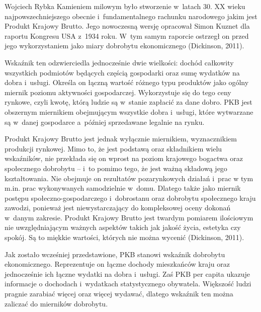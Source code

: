 \begin{artplenv}{Wojciech Rybka}
Kamieniem milowym było stworzenie w~latach 30. XX wieku najpowszechniejszego obecnie i~fundamentalnego rachunku
narodowego jakim jest Produkt Krajowy Brutto. Jego nowoczesną wersję opracował Simon Kuznet dla raportu Kongresu
USA z~1934 roku. W~tym samym raporcie ostrzegł on przed jego wykorzystaniem jako miary dobrobytu ekonomicznego
\label{ref:RND7xFAqFbE0Z}(Dickinson, 2011).

Wskaźnik ten odzwierciedla jednocześnie dwie wielkości: dochód całkowity wszystkich podmiotów będących częścią
gospodarki oraz sumę wydatków na dobra i~usługi. Określa on łączną wartość różnego typu produktów jako ogólny miernik
poziomu aktywności gospodarczej. Wykorzystuje się do tego ceny rynkowe, czyli kwotę, którą ludzie są w~stanie zapłacić
za dane dobro. PKB jest obszernym miernikiem obejmującym wszystkie dobra i~usługi, które wytwarzane są w~danej
gospodarce a~później sprzedawane legalnie na rynku.

Produkt Krajowy Brutto jest jednak wyłącznie miernikiem, wyznacznikiem produkcji rynkowej. Mimo to, że jest podstawą
oraz składnikiem wielu wskaźników, nie przekłada się on wprost na poziom krajowego bogactwa oraz społecznego
dobrobytu -- i~to pomimo tego, że jest ważną składową jego kształtowania. Nie obejmuje on rezultatów pozarynkowych działań i~prac
w tym m.in. prac wykonywanych samodzielnie w~domu. Dlatego także jako miernik postępu
społeczno-gospodarczego i~dobrostanu oraz dobrobytu społecznego kraju zawodzi, ponieważ
jest niewystarczający do kompleksowej oceny dokonań w~danym zakresie.
Produkt Krajowy Brutto jest twardym pomiarem ilościowym nie uwzględniającym ważnych aspektów takich jak
jakość życia, estetyka czy spokój. Są to miękkie wartości, których nie można wycenić
\label{ref:RNDfhz8Pbmn8G}(Dickinson, 2011).

Jak zostało wcześniej przedstawione, PKB stanowi wskaźnik dobrobytu ekonomicznego. Reprezentuje on łączne dochody
mieszkańców kraju oraz jednocześnie ich łączne wydatki na dobra i~usługi. Zaś PKB per capita ukazuje informacje o
dochodach i~wydatkach statystycznego obywatela. Większość ludzi pragnie zarabiać więcej oraz więcej wydawać, dlatego
wskaźnik ten można zaliczać do mierników dobrobytu.


\end{artplenv}
